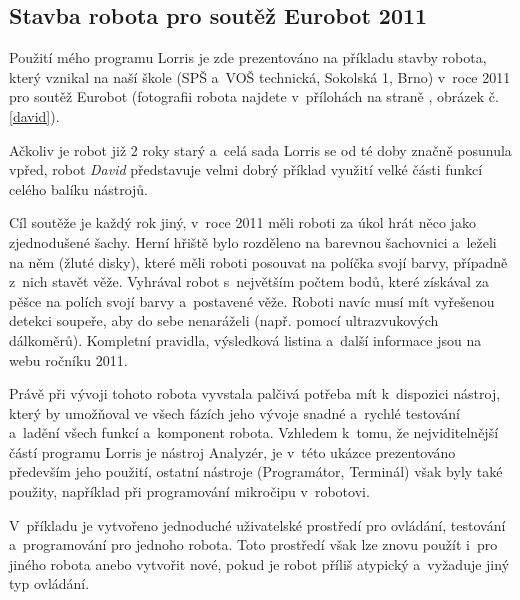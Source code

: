 \documentclass[12pt, a4paper, oneside]{article}
\newcommand{\It}{\textit}  %
\begin{document}
\newpage
\subsection{Stavba robota pro soutěž Eurobot 2011}
Použití mého programu Lorris je zde prezentováno na příkladu stavby robota, který vznikal na naší škole (SPŠ a~VOŠ technická, Sokolská 1, Brno) v~roce 2011 pro soutěž Eurobot\cite{eurobot} (fotografii robota najdete v~přílohách na straně \pageref{david}, obrázek č. \ref{david}).

Ačkoliv je robot již 2 roky starý a~celá sada Lorris se od té doby značně posunula vpřed, robot \It{David} představuje velmi dobrý příklad využití velké části funkcí celého balíku nástrojů.

Cíl soutěže je každý rok jiný, v~roce 2011 měli roboti za úkol hrát něco jako zjednodušené šachy. Herní hřiště bylo rozděleno na barevnou šachovnici a~leželi na něm  (žluté disky), které měli roboti posouvat na políčka svojí barvy, případně z~nich stavět věže. Vyhrával robot s~největším počtem bodů, které získával za pěšce na polích svojí barvy a~postavené věže. Roboti navíc musí mít vyřešenou detekci soupeře, aby do sebe nenaráželi (např. pomocí ultrazvukových dálkoměrů). Kompletní pravidla, výsledková listina a~další informace jsou na webu ročníku 2011\cite{eurobot11}.

Právě při vývoji tohoto robota vyvstala palčivá potřeba mít k~dispozici nástroj, který by umožňoval ve všech fázích jeho vývoje snadné a~rychlé testování a~ladění všech funkcí a~komponent robota. Vzhledem k~tomu, že nejviditelnější částí programu Lorris je nástroj Analyzér, je v~této ukázce prezentováno především jeho použití, ostatní nástroje (Programátor, Terminál) však byly také použity, například při programování mikročipu v~robotovi.

V~příkladu je vytvořeno jednoduché uživatelské prostředí pro ovládání, testování a~programování pro jednoho robota. Toto prostředí však lze znovu použít i~pro jiného robota anebo vytvořit nové, pokud je robot příliš atypický a~vyžaduje jiný typ ovládání.


\newpage
\end{document}

